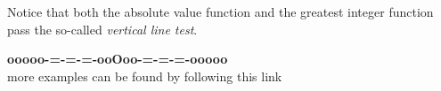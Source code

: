 \documentclass{ximera}
\begin{document}
Notice that both the absolute value function and the greatest integer function pass the so-called \textit{vertical line test}.






















\begin{center}
\textbf{\textcolor{green!50!black}{ooooo-=-=-=-ooOoo-=-=-=-ooooo}} \\

more examples can be found by following this link\\ 

\end{center}
\end{document}
